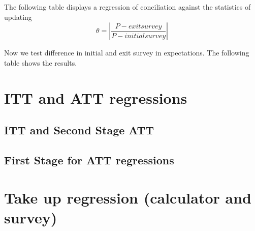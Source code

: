 \documentclass[12pt]{article}
\theoremstyle{named}
\newcommand{\folder}{./Effect}
\begin{document}
\pagebreak

The following table displays a regression of conciliation against the statistics of updating
\[\theta=\left|\frac{P-exitsurvey}{P-initialsurvey}\right|\]

\begin{center}
\scriptsize{}
\end{center}


\pagebreak


Now we test difference in initial and exit survey in expectations. The following table shows the results.

\begin{center}
\scriptsize{}
\end{center}

\pagebreak

\section{ITT and ATT regressions}

\begin{landscape}
\subsection*{ITT and Second Stage ATT}

\begin{center}
\scriptsize{}
\end{center}

\end{landscape}

\pagebreak


\subsection*{First Stage for ATT regressions}

\begin{center}
\scriptsize{}
\end{center}


\section{Take up regression (calculator and survey)}


\begin{center}
\scriptsize{}
\end{center}


\end{document}
